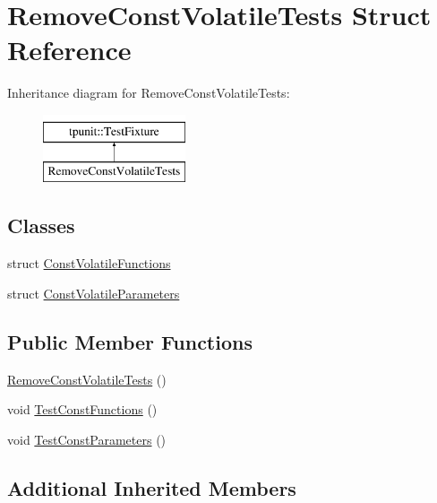\hypertarget{structRemoveConstVolatileTests}{}\section{Remove\+Const\+Volatile\+Tests Struct Reference}
\label{structRemoveConstVolatileTests}
Inheritance diagram for Remove\+Const\+Volatile\+Tests\+:\begin{figure}[H]
\begin{center}
\leavevmode
\includegraphics[height=2.000000cm]{structRemoveConstVolatileTests}
\end{center}
\end{figure}
\subsection*{Classes}
\begin{DoxyCompactItemize}
\item 
struct \mbox{\hyperlink{structRemoveConstVolatileTests_1_1ConstVolatileFunctions}{Const\+Volatile\+Functions}}
\item 
struct \mbox{\hyperlink{structRemoveConstVolatileTests_1_1ConstVolatileParameters}{Const\+Volatile\+Parameters}}
\end{DoxyCompactItemize}
\subsection*{Public Member Functions}
\begin{DoxyCompactItemize}
\item 
\mbox{\hyperlink{structRemoveConstVolatileTests_a4609b6123d1a1464148a2347b8a13634}{Remove\+Const\+Volatile\+Tests}} ()
\item 
void \mbox{\hyperlink{structRemoveConstVolatileTests_a0f92bdf2cc44960ccc38f9a4dd55f10c}{Test\+Const\+Functions}} ()
\item 
void \mbox{\hyperlink{structRemoveConstVolatileTests_a4b97769225a165aac566e74714999cec}{Test\+Const\+Parameters}} ()
\end{DoxyCompactItemize}
\subsection*{Additional Inherited Members}


